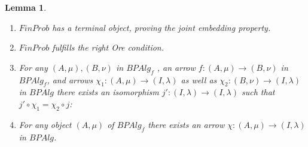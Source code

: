 \documentclass[a4paper]{amsproc}
\theoremstyle{plain}
\newtheorem{lemma}{Lemma}[section]
\theoremstyle{definition}
\theoremstyle{remark}
\numberwithin{equation}{section}
\begin{document}
\begin{lemma}\begin{enumerate}
\item $FinProb$ has a terminal object, proving the joint embedding property.
\item $FinProb$ fulfills the right Ore condition.
\item For any $(A,\mu),(B,\nu)$ in $BPAlg_f$ , an arrow $f:(A,\mu)\rightarrow (B,\nu)$ in \\
 $BPAlg_f$, and arrows $\chi_1:(A,\mu)\rightarrow (I,\lambda)$ as well as $\chi_2:(B,\nu)\rightarrow (I,\lambda)$ in $BPAlg$ there exists an isomorphism $j':(I,\lambda)\rightarrow (I,\lambda)$ such that $j'\circ \chi_1=\chi_2\circ j$:
 \begin{center}
 \end{center}
\item For any object $(A,\mu)$ of $BPAlg_f$ there exists an arrow $\chi:(A,\mu)\rightarrow (I,\lambda)$ in $BPAlg$.
\end{enumerate}
\end{lemma}
\end{document}
